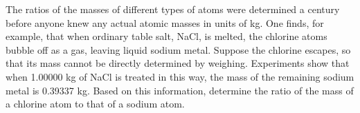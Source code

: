 The ratios of the masses of different types of atoms were determined a century
        before anyone knew any actual atomic masses in units of kg. One finds, for example,
        that when ordinary table salt, NaCl, is melted, the chlorine atoms bubble off as a
        gas, leaving liquid sodium metal. Suppose the chlorine escapes, so that
        its mass cannot be directly determined by weighing. Experiments show that when 1.00000 kg
        of NaCl is treated in this way, the mass of the remaining sodium metal is 0.39337 kg.
        Based on this information, determine the ratio of the mass of a chlorine atom
        to that of a sodium atom.\answercheck
